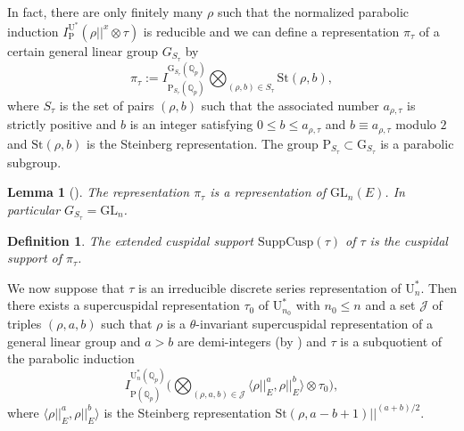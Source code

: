 \documentclass[reqno,11pt]{amsart}
\newtheorem{lemma}[theorem]{Lemma}
\newtheorem{definition}[theorem]{Definition}
\theoremstyle{remark}
\newcommand{\G}{\mathrm{G}}
\newcommand{\U}{\mathrm{U}}
\newcommand{\GL}{\mathrm{GL}}
\newcommand{\Q}{\mathbb{Q}}
\newcommand{\St}{\mathrm{St}}
\newcommand{\SuppCusp}{\mathrm{SuppCusp}}
\newcommand{\mP}{\mathrm{P}}
\begin{document}
In fact, there are only finitely many $\rho$ such that the normalized parabolic induction $I^{\U^*}_{\mP} (\rho||^x \otimes \tau)$ is reducible and we can define a representation $\pi_{\tau}$ of a certain general linear group $G_{S_{\tau}}$ by
\[
\pi_{\tau} := I^{\G_{S_{\tau}}(\Q_p)}_{\mP_{S_{\tau}}(\Q_p)} \bigotimes_{(\rho, b) \in S_{\tau} } \St(\rho, b),
\]
where $S_{\tau}$ is the set of pairs $(\rho, b)$ such that the associated number $a_{\rho, \tau}$ is strictly positive and $b$ is an integer satisfying $ 0 \leq b \leq a_{\rho, \tau} $ and $ b \equiv a_{\rho, \tau} $ modulo $2$ and $\St(\rho, b)$ is the Steinberg representation. The group $\mP_{S_{\tau}} \subset \G_{S_{\tau}}$ is a parabolic subgroup.

\begin{lemma}[{\cite[\S5.3]{Moe}}]
The representation $\pi_{\tau}$ is a representation of $\GL_n(E)$. In particular $G_{S_{\tau}} = \GL_n$.
\end{lemma}
\begin{definition}
The \emph{extended cuspidal support} $\SuppCusp (\tau)$ of $\tau$ is the cuspidal support of $\pi_{\tau}$.
\end{definition}

We now suppose that $\tau$ is an irreducible discrete series representation of $\U^*_n$. Then there exists a supercuspidal representation $\tau_0$ of $\U^*_{n_0}$ with $n_0 \leq n$ and a set $\mathcal{J}$ of triples $(\rho, a, b)$ such that $\rho$ is a $\theta$-invariant supercuspidal representation of a general linear group and $a > b$ are demi-integers (by \cite[sec. 5.1]{Moe}) and $\tau$ is a subquotient of the parabolic induction
\[
I_{\mP(\mathbb{Q}_{p})}^{\U^*_n(\mathbb{Q}_{p})}\big( \bigotimes_{(\rho, a, b) \in \mathcal{J}} \langle \rho ||^{a}_E, \rho ||^{b}_E \rangle \otimes \tau_{0} \big),
\]
where $\langle \rho ||^{a}_E, \rho ||^{b}_E \rangle$ is the Steinberg representation $\St(\rho, a-b+1) ||^{(a+b)/2} $.
\end{document}

